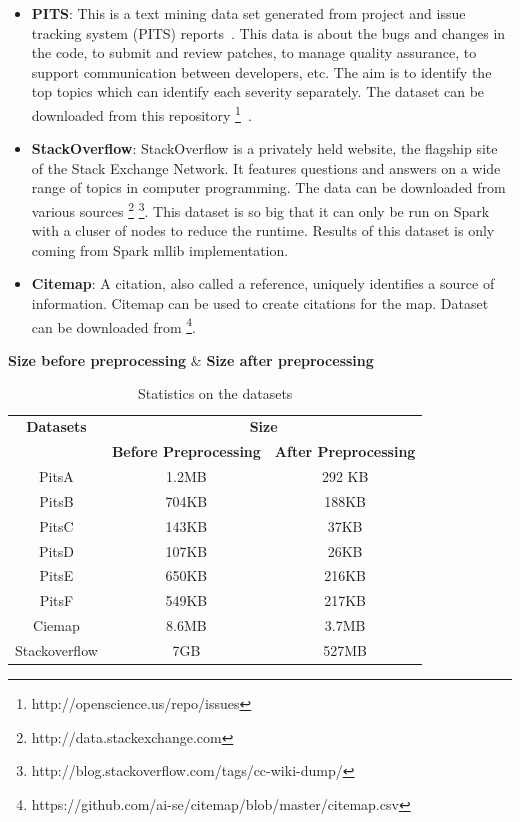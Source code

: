 \documentclass[conference]{IEEEtran}
\theoremstyle{break}
\begin{document}
\begin{itemize}
    \item \textbf{PITS}: This is a text mining data set generated from project and issue tracking system (PITS) reports~\cite{menzies2008improving, menzies2008automated}. This data is about the bugs and changes in the code, to submit and review patches, to manage quality assurance, to support communication between developers, etc. The aim is to identify the top topics which can identify each severity separately. The dataset can be downloaded from this repository \footnote{http://openscience.us/repo/issues}~\cite{promiserepo}. 
    
    \item \textbf{StackOverflow}: StackOverflow is a privately held website, the flagship site of the Stack Exchange Network. It features questions and answers on a wide range of topics in computer programming. The data can be downloaded from various sources \footnote{http://data.stackexchange.com} \footnote{http://blog.stackoverflow.com/tags/cc-wiki-dump/}. This dataset is so big that it can only be run on Spark with a cluser of nodes to reduce the runtime. Results of this dataset is only coming from Spark mllib implementation.
    
    \item \textbf{Citemap}: A citation, also called a reference, uniquely identifies a source of information. Citemap can be used to create citations for the map. Dataset can be downloaded from \footnote{https://github.com/ai-se/citemap/blob/master/citemap.csv}. 
\end{itemize}

\textbf{Size before preprocessing} & \textbf{Size after preprocessing}

\begin{table}[H]
\begin{center}
\begin{tabular}{|c|c|c|}
        \hline 
        \textbf{Datasets} & \multicolumn{2}{|c|}{\textbf{Size}} \\ [0.5ex]
        \cline{2-3}
        & \textbf{Before Preprocessing} & \textbf{After Preprocessing}\\ [0.5ex]
        \hline
        PitsA & 1.2MB & 292 KB \\ [0.5ex]
        \hline
        PitsB & 704KB & 188KB \\ [0.5ex]
        \hline
        PitsC & 143KB & 37KB \\ [0.5ex]
        \hline
        PitsD & 107KB & 26KB \\ [0.5ex]
        \hline
        PitsE & 650KB & 216KB \\ [0.5ex]
        \hline
        PitsF & 549KB & 217KB \\ [0.5ex]
        \hline
        Ciemap & 8.6MB & 3.7MB \\ [0.5ex]
        \hline
        Stackoverflow & 7GB & 527MB \\ [0.5ex]
        \hline
\end{tabular}
\end{center}
\caption{Statistics on the datasets}
\label{tb:dataset}
\end{table}
\end{document}
